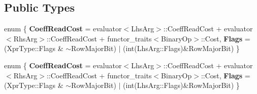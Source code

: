 \subsection*{Public Types}
\begin{DoxyCompactItemize}
\item 
\mbox{\label{struct_eigen_1_1internal_1_1sparse__conjunction__evaluator_3_01_xpr_type_00_01_iterator_based_00_01_index_based_01_4_a392c320407da790ea4b1c965d1153345}} 
enum \{ {\bfseries Coeff\+Read\+Cost} = evaluator$<$Lhs\+Arg$>$\+:\+:Coeff\+Read\+Cost + evaluator$<$Rhs\+Arg$>$\+:\+:Coeff\+Read\+Cost + functor\+\_\+traits$<$Binary\+Op$>$\+:\+:Cost, 
{\bfseries Flags} = (Xpr\+Type\+:\+:Flags \& $\sim$\+Row\+Major\+Bit) $\vert$ (int(Lhs\+Arg\+:\+:Flags)\&Row\+Major\+Bit)
 \}
\item 
\mbox{\label{struct_eigen_1_1internal_1_1sparse__conjunction__evaluator_3_01_xpr_type_00_01_iterator_based_00_01_index_based_01_4_a5ccbd01a0daabdc53174b26ff4326128}} 
enum \{ {\bfseries Coeff\+Read\+Cost} = evaluator$<$Lhs\+Arg$>$\+:\+:Coeff\+Read\+Cost + evaluator$<$Rhs\+Arg$>$\+:\+:Coeff\+Read\+Cost + functor\+\_\+traits$<$Binary\+Op$>$\+:\+:Cost, 
{\bfseries Flags} = (Xpr\+Type\+:\+:Flags \& $\sim$\+Row\+Major\+Bit) $\vert$ (int(Lhs\+Arg\+:\+:Flags)\&Row\+Major\+Bit)
 \}
\end{DoxyCompactItemize}
